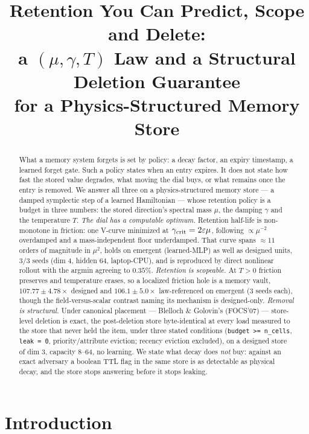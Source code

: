 \documentclass{article}
\title{Retention You Can Predict, Scope and Delete:\\ a $(\mu,\gamma,T)$ Law and a Structural Deletion Guarantee\\ for a Physics-Structured Memory Store}
\author{}
\begin{document}
\maketitle
\begin{abstract}
What a memory system forgets is set by policy: a decay factor, an expiry timestamp, a learned forget gate. Such a policy states when an entry expires. It does not state how fast the stored value degrades, what moving the dial buys, or what remains once the entry is removed. We answer all three on a physics-structured memory store --- a damped symplectic step of a learned Hamiltonian --- whose retention policy is a budget in three numbers: the stored direction's spectral mass $\mu$, the damping $\gamma$ and the temperature $T$. \emph{The dial has a computable optimum.} Retention half-life is non-monotone in friction: one V-curve minimized at $\gamma_{\rm crit}=2\varepsilon\mu$, following $\propto\mu^{-2}$ overdamped and a mass-independent floor underdamped. That curve spans $\approx11$ orders of magnitude in $\mu^2$, holds on emergent (learned-MLP) as well as designed units, 3/3 seeds (dim 4, hidden 64, laptop-CPU), and is reproduced by direct nonlinear rollout with the argmin agreeing to $0.35\%$. \emph{Retention is scopeable.} At $T>0$ friction preserves and temperature erases, so a localized friction hole is a memory vault, $107.77\pm4.78\times$ designed and $106.1\pm5.0\times$ law-referenced on emergent (3 seeds each), though the field-versus-scalar contrast naming its mechanism is designed-only. \emph{Removal is structural.} Under canonical placement --- Blelloch \& Golovin's (FOCS'07) --- store-level deletion is exact, the post-deletion store byte-identical at every load measured to the store that never held the item, under three stated conditions (\texttt{budget >= n\_cells}, \texttt{leak = 0}, priority/attribute eviction; recency eviction excluded), on a designed store of dim 3, capacity 8--64, no learning. We state what decay does \emph{not} buy: against an exact adversary a boolean TTL flag in the same store is as detectable as physical decay, and the store stops answering before it stops leaking.
\end{abstract}

\section{Introduction}\label{sec:intro}
\end{document}
